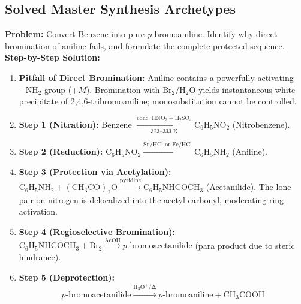 \documentclass[10pt,twoside,openright]{book}
\begin{document}
\subsection{Solved Master Synthesis Archetypes}

\begin{usecasebox}
\textbf{Problem:} Convert Benzene into pure \textit{p}-bromoaniline. Identify why direct bromination of aniline fails, and formulate the complete protected sequence.
\textbf{Step-by-Step Solution:}
\begin{enumerate}[leftmargin=*]
  \item \textbf{Pitfall of Direct Bromination:} Aniline contains a powerfully activating $-\mathrm{NH_2}$ group ($+M$). Bromination with $\mathrm{Br_2 / H_2O}$ yields instantaneous white precipitate of 2,4,6-tribromoaniline; monosubstitution cannot be controlled.
  \item \textbf{Step 1 (Nitration):} Benzene $\xrightarrow[\text{323--333 K}]{\text{conc. } \mathrm{HNO_3} + \mathrm{H_2SO_4}} \mathrm{C_6H_5NO_2}$ (Nitrobenzene).
  \item \textbf{Step 2 (Reduction):} $\mathrm{C_6H_5NO_2} \xrightarrow{\mathrm{Sn / HCl \text{ or } Fe / HCl}} \mathrm{C_6H_5NH_2}$ (Aniline).
  \item \textbf{Step 3 (Protection via Acetylation):} $\mathrm{C_6H_5NH_2} + \mathrm{(CH_3CO)_2O} \xrightarrow{\text{pyridine}} \mathrm{C_6H_5NHCOCH_3}$ (Acetanilide). The lone pair on nitrogen is delocalized into the acetyl carbonyl, moderating ring activation.
  \item \textbf{Step 4 (Regioselective Bromination):}
  $\mathrm{C_6H_5NHCOCH_3} + \mathrm{Br_2} \xrightarrow{\mathrm{AcOH}} p\text{-bromoacetanilide}$ (para product due to steric hindrance).
  \item \textbf{Step 5 (Deprotection):}
  \begin{equation*}
    p\text{-bromoacetanilide} \xrightarrow{\mathrm{H_3O^+ / \Delta}} p\text{-bromoaniline} + \mathrm{CH_3COOH}
  \end{equation*}
\end{enumerate}
\end{usecasebox}
\end{document}
